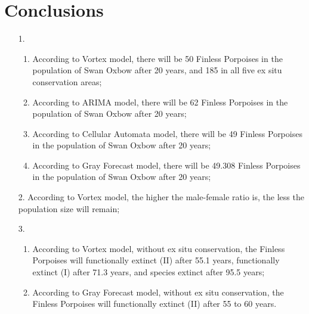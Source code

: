\documentclass{mcmthesis}
\numberwithin{figure}{section}
\numberwithin{table}{section}
\numberwithin{equation}{section}
\begin{document}
\section{Conclusions}
\begin{enumerate}
  \item [1.] 
  \begin{enumerate}
    \item According to Vortex model, there will be 50 
  Finless Porpoises in the population of Swan Oxbow after 
  20 years, and 185 in all five ex situ conservation areas;
  \item According to ARIMA model, there will be 62 
  Finless Porpoises in the population of Swan Oxbow after 
  20 years;
  \item According to Cellular Automata model, there will be 49 
  Finless Porpoises in the population of Swan Oxbow after 
  20 years;
  \item According to Gray Forecast model, there will be 49.308 
  Finless Porpoises in the population of Swan Oxbow after 
  20 years;
  \end{enumerate}
  \item [2.] According to Vortex model, the higher the male-female ratio is, 
  the less the population size will remain;
  \item [3.] \begin{enumerate}
    \item According to Vortex model, without ex situ conservation, 
    the Finless Porpoises will functionally extinct (II) after 55.1 years, 
    functionally extinct (I) after 71.3 years, and species extinct after 95.5 years;
    \item According to Gray Forecast model, without ex situ conservation, 
    the Finless Porpoises will functionally extinct (II) after 55 to 60 years.
  \end{enumerate}
\end{enumerate}




\newpage
{}
\memodate{\today}
\end{document}
